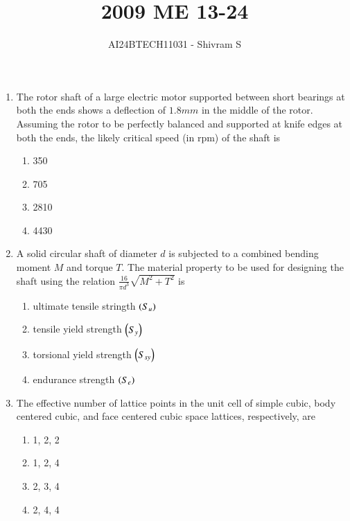 \documentclass[journal]{IEEEtran}
\begin{document}

\onecolumn

\title{2009 ME 13-24}
\author{AI24BTECH11031 - Shivram S}
\maketitle
\bigskip

\renewcommand{\thefigure}{\theenumi}
\renewcommand{\thetable}{\theenumi}

\begin{enumerate}
    \item The rotor shaft of a large electric motor supported between short bearings at both the ends
    shows a deflection of $1.8 mm$ in the middle of the rotor. Assuming the rotor to be perfectly balanced
    and supported at knife edges at both the ends, the likely critical speed (in rpm) of the shaft is

    \begin{multicols}{4}
    \begin{enumerate}
        \item 350
        \item 705
        \item 2810
        \item 4430
    \end{enumerate}
    \end{multicols}

    \item A solid circular shaft of diameter $d$ is subjected to a combined bending moment $M$ and torque
    $T$. The material property to be used for designing the shaft using the relation $\frac{16}{\pi d^3}\sqrt{M^2 + T^2}$
    is

    \begin{multicols}{2}
    \begin{enumerate}
        \item ultimate tensile stringth $\left(S_u\right)$
        \item tensile yield strength $\left(S_y\right)$
        \item torsional yield strength $\left(S_{sy}\right)$
        \item endurance strength $\left(S_e\right)$
    \end{enumerate}
    \end{multicols}

    \item The effective number of lattice points in the unit cell of simple cubic, body centered cubic,
    and face centered cubic space lattices, respectively, are
    \begin{multicols}{4}
    \begin{enumerate}
        \item 1, 2, 2
        \item 1, 2, 4
        \item 2, 3, 4
        \item 2, 4, 4
    \end{enumerate}
    \end{multicols}


\end{enumerate}
\end{document}
